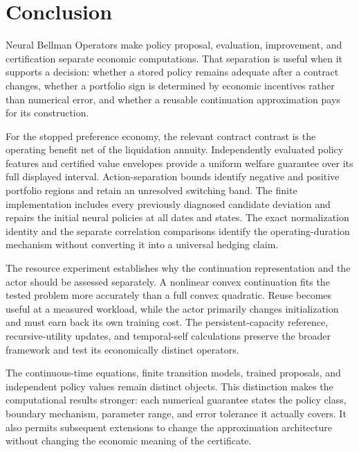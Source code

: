 \section{Conclusion}
Neural Bellman Operators make policy proposal, evaluation, improvement, and certification separate economic computations. That separation is useful when it supports a decision: whether a stored policy remains adequate after a contract changes, whether a portfolio sign is determined by economic incentives rather than numerical error, and whether a reusable continuation approximation pays for its construction.

For the stopped preference economy, the relevant contract contrast is the operating benefit net of the liquidation annuity. Independently evaluated policy features and certified value envelopes provide a uniform welfare guarantee over its full displayed interval. Action-separation bounds identify negative and positive portfolio regions and retain an unresolved switching band. The finite implementation includes every previously diagnosed candidate deviation and repairs the initial neural policies at all dates and states. The exact normalization identity and the separate correlation comparisons identify the operating-duration mechanism without converting it into a universal hedging claim.

The resource experiment establishes why the continuation representation and the actor should be assessed separately. A nonlinear convex continuation fits the tested problem more accurately than a full convex quadratic. Reuse becomes useful at a measured workload, while the actor primarily changes initialization and must earn back its own training cost. The persistent-capacity reference, recursive-utility updates, and temporal-self calculations preserve the broader framework and test its economically distinct operators.

The continuous-time equations, finite transition models, trained proposals, and independent policy values remain distinct objects. This distinction makes the computational results stronger: each numerical guarantee states the policy class, boundary mechanism, parameter range, and error tolerance it actually covers. It also permits subsequent extensions to change the approximation architecture without changing the economic meaning of the certificate.

